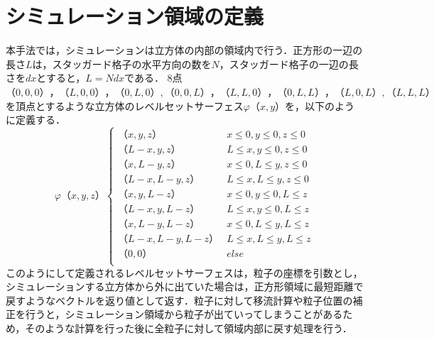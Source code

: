 \documentclass[a4j,12pt]{jreport}
\begin{document}
\section{シミュレーション領域の定義} \label{sec:levelsetserface}
本手法では，シミュレーションは立方体の内部の領域内で行う．正方形の一辺の長さ$L$は，スタッガード格子の水平方向の数を$N$，スタッガード格子の一辺の長さを$dx$とすると，$L = Ndx$である．
8点$（0,0,0），（L,0,0），（0,L,0）,（0,0,L），（L,L,0），（0,L,L），（L,0,L）,（L,L,L）$を頂点とするような立方体のレベルセットサーフェス$\varphi（x,y）$を，以下のように定義する．
\begin{equation}\label{eq:levelsetserface}
\varphi（x,y,z）
\begin{cases}
（x,y,z） & x \le0 , y \le 0,z \le 0\\
（L - x,y,z） & L \le x , y \le 0,z \le 0\\
（x,L-y,z） & x \le0 , L \le y,z \le 0\\
（L-x,L-y,z） & L \le x , L \le y,z \le 0\\
（x,y,L-z） & x \le0 , y \le 0,L \le z\\
（L - x,y,L-z） & L \le x , y \le 0,L \le z\\
（x,L-y,L-z） & x \le0 , L \le y,L \le z\\
（L-x,L-y,L-z） & L \le x , L \le y,L \le z\\
（0,0） & else\\
\end{cases}
\end{equation} 
このようにして定義されるレベルセットサーフェスは，粒子の座標を引数とし，シミュレーションする立方体から外に出ていた場合は，正方形領域に最短距離で戻すようなベクトルを返り値として返す．粒子に対して移流計算や粒子位置の補正を行うと，シミュレーション領域から粒子が出ていってしまうことがあるため，そのような計算を行った後に全粒子に対して領域内部に戻す処理を行う．
\end{document}
